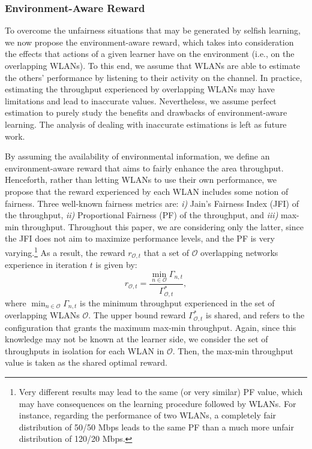 \documentclass[preprint,12pt]{elsarticle}
\begin{document}
\subsubsection{Environment-Aware Reward}
\label{subsubsection:informed_learning}
To overcome the unfairness situations that may be generated by selfish learning, we now propose the environment-aware reward, which takes into consideration the effects that actions of a given learner have on the environment (i.e., on the overlapping WLANs). To this end, we assume that WLANs are able to estimate the others' performance by listening to their activity on the channel. In practice, estimating the throughput experienced by overlapping WLANs may have limitations and lead to inaccurate values. Nevertheless, we assume perfect estimation to purely study the benefits and drawbacks of environment-aware learning. The analysis of dealing with inaccurate estimations is left as future work.

By assuming the availability of environmental information, we define an environment-aware reward that aims to fairly enhance the area throughput. Henceforth, rather than letting WLANs to use their own performance, we propose that the reward experienced by each WLAN includes some notion of fairness. Three well-known fairness metrics are: \emph{i)} Jain's Fairness Index (JFI) of the throughput, \emph{ii)} Proportional Fairness (PF) of the throughput, and \emph{iii)} max-min throughput. Throughout this paper, we are considering only the latter, since the JFI does not aim to maximize performance levels, and the PF is very varying.\footnote{Very different results may lead to the same (or very similar) PF value, which may have consequences on the learning procedure followed by WLANs. For instance, regarding the performance of two WLANs, a completely fair distribution of 50/50 Mbps leads to the same PF than a much more unfair distribution of 120/20 Mbps.} As a result, the reward $r_{\mathcal{O},t}$ that a set of $\mathcal{O}$ overlapping networks experience in iteration $t$ is given by:
\begin{equation}
	r_{\mathcal{O},t} =\frac{\min_{n \in \mathcal{O}} \Gamma_{n,t}}{\Gamma_{\mathcal{O},t}^*}, 
	\nonumber
\end{equation}			
where $\min_{n \in \mathcal{O}} \Gamma_{n,t}$ is the minimum throughput experienced in the set of overlapping WLANs $\mathcal{O}$. The upper bound reward $\Gamma_{\mathcal{O},t}^*$ is shared, and refers to the configuration that grants the maximum max-min throughput. Again, since this knowledge may not be known at the learner side, we consider the set of throughputs in isolation for each WLAN in $\mathcal{O}$. Then, the max-min throughput value is taken as the shared optimal reward.
\end{document}
